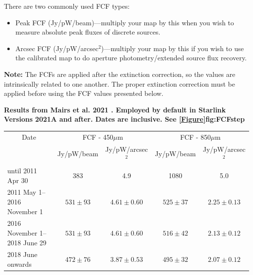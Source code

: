 \vspace{5mm}

There are two commonly used FCF types:
\begin{itemize}
\item Peak FCF (Jy/pW/beam)---multiply your map by this when you wish
to measure absolute peak fluxes of discrete sources.
\item Arcsec FCF (Jy/pW/arcsec$^2$)---multiply your map by this if
you wish to use the calibrated map to do aperture photometry/extended source flux recovery.
\end{itemize}

\textbf{Note:} The FCFs are applied after the extinction correction, so the values are intrinsically
related to one another. The proper extinction correction must be applied before using the FCF
values presented below.

\newpage

\textbf{Results from Mairs et al. 2021 \cite{mairs21}. Employed by
default in Starlink Versions 2021A and after. Dates are inclusive. See
\cref{Figure}{fig:FCFstep}{}}\\
\begin{table}[h!]
\begin{center}
\begin{tabular}{|l|c|c|c|c|}
 \hline
 \multicolumn{1}{|c|}{Date} &
 \multicolumn{2}{c|}{FCF - 450$\mu$m} &
 \multicolumn{2}{c|}{FCF - 850$\mu$m} \\
\cline{2-5}
& Jy/pW/beam &Jy/pW/arcsec$^2$ & Jy/pW/beam &Jy/pW/arcsec$^2$ \\
 \hline
until 2011 Apr 30 &383  & 4.9 &1080 &5.0 \\
2011 May 1--2016 November 1 & $531\pm93$ & $4.61\pm0.60$ & $525\pm37$ & $2.25\pm0.13$ \\
2016 November 1--2018 June 29& $531\pm93$ & $4.61\pm0.60$ & $516\pm42$ & $2.13\pm0.12$ \\
2018 June onwards & $472\pm76$ & $3.87\pm0.53$ & $495\pm32$ &$2.07\pm0.12$ \\
\hline
\end{tabular}
\end{center}
\end{table}

